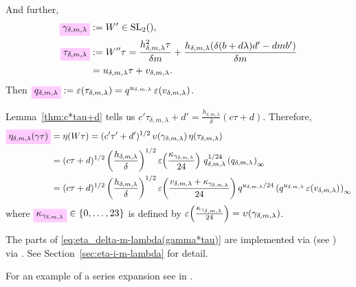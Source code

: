 \documentclass{article}
\begin{document}
And further,
\begin{align}
  \defineNotation[gamma-delta-m-lambda]{\gamma_{\delta,m,\lambda}}
  &:=
    W'\in\SL2Z,
    \label{eq:gamma_delta-m-lambda}
  \\
  \defineNotation[tau-delta-m-lambda]{\tau_{\delta,m,\lambda}}
  &:=
    W''\tau
    = \frac{h_{\delta,m,\lambda}^2 \tau}{\delta m} +
    \frac{h_{\delta,m,\lambda}(\delta (b + d \lambda) d' - d m
    b')}{\delta m}
  \notag\\
    &= u_{\delta,m,\lambda} \tau + v_{\delta,m,\lambda}.
  \label{eq:tau_delta-m-lambda}
\end{align}
Then
$\defineNotation[q-delta-m-lambda]{q_{\delta,m,\lambda}} :=
\unityPower{\tau_{\delta,m,\lambda}} =
q^{u_{\delta,m,\lambda}}\,\unityPower{v_{\delta,m,\lambda}}$.


Lemma~\ref{thm:c*tau+d} tells us
$c'\tau_{\delta,m,\lambda}+d' = \frac{h_{\delta,m,\lambda}}{\delta} (c \tau + d)$.
%
Therefore,
\begin{align}
  \defineNotation[eta-delta-m-lambda-gamma-tau]{\eta_{\delta,m,\lambda}(\gamma \tau)}
  &= \eta(W \tau)
    = (c'\tau'+d')^{1/2} \, \upsilon(\gamma_{\delta,m,\lambda})
    \,\eta(\tau_{\delta,m,\lambda})\notag\\
  &=
    (c\tau+d)^{1/2}
    \left(\frac{h_{\delta,m,\lambda}}{\delta}\right)^{1/2}
    \unityPower{\frac{\kappa_{\gamma_{\delta,m,\lambda}}}{24}} \,
    q_{\delta,m,\lambda}^{1/24}
    \eulerFunction[q_{\delta,m,\lambda}]{}\notag\\
  &=
    (c\tau+d)^{1/2}
    \left(\frac{h_{\delta,m,\lambda}}{\delta}\right)^{1/2}
    \unityPower{\frac{ v_{\delta,m,\lambda} + \kappa_{\gamma_{\delta,m,\lambda}}}{24}}
    q^{u_{\delta,m,\lambda}/24}
    \eulerFunction[q^{u_{\delta,m,\lambda}}\,\unityPower{v_{\delta,m,\lambda}}]{}
    \label{eq:eta_delta-m-lambda(gamma*tau)}
\end{align}
where
$\defineNotation[kappa-gamma-delta-m-lambda]{\kappa_{\gamma_{\delta,m,\lambda}}}
\in \Set{0,\ldots,23}$ is defined by
$\varepsilon\!\left(\frac{\kappa_{\gamma_{\delta,m,\lambda}}}{24}\right) =
\upsilon(\gamma_{\delta,m,\lambda})$.

The parts of \eqref{eq:eta_delta-m-lambda(gamma*tau)} are implemented
via \textcolor{blue}{} (see
) via
.
See Section~\ref{sec:eta-i-m-lambda} for detail.

For an example of a series expansion see
 in
.
\end{document}
